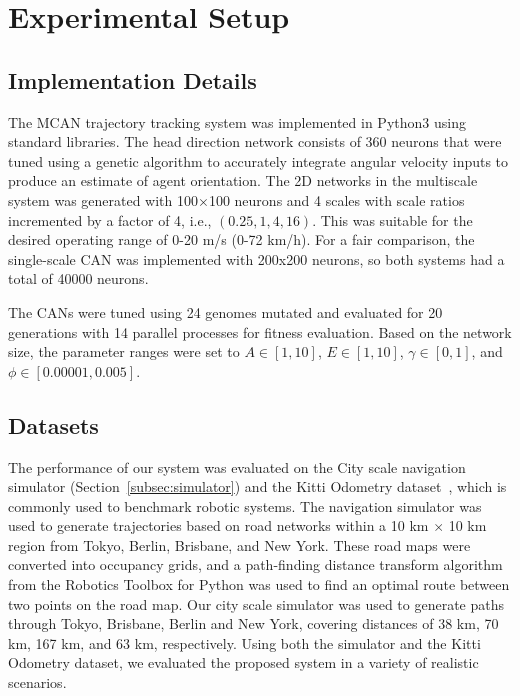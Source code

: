 \section{Experimental Setup}
\label{sec:experimentalsetup}
\subsection{Implementation Details}
The MCAN trajectory tracking system was implemented in Python3 using standard libraries. The head direction network consists of 360 neurons that were tuned using a genetic algorithm to accurately integrate angular velocity inputs to produce an estimate of agent orientation. The 2D networks in the multiscale system was generated with 100$\times$100 neurons and 4 scales with scale ratios incremented by a factor of 4, i.e., $(0.25, 1, 4, 16)$. This was suitable for the desired operating range of 0-20 m/s (0-72 km/h). For a fair comparison, the single-scale CAN was implemented with 200x200 neurons, so both systems had a total of 40000 neurons.  

The CANs were tuned using 24 genomes mutated and evaluated for 20 generations with 14 parallel processes for fitness evaluation. Based on the network size, the parameter ranges were set to $A \in [1, 10]$, $E \in [1, 10]$, $\gamma \in [0, 1]$, and $\phi \in [0.00001, 0.005]$.

\subsection{Datasets}
The performance of our system was evaluated on the City scale navigation simulator (Section~\ref{subsec:simulator}) and the Kitti Odometry dataset~\cite{geiger2012we}, which is commonly used to benchmark robotic systems. The navigation simulator was used to generate trajectories based on road networks within a 10 km $\times$ 10 km region from Tokyo, Berlin, Brisbane, and New York. These road maps were converted into occupancy grids, and a path-finding distance transform algorithm from the Robotics Toolbox for Python \cite{corke2021not} was used to find an optimal route between two points on the road map. Our city scale simulator was used to generate paths through Tokyo,  Brisbane, Berlin and New York, covering distances of 38 km, 70 km, 167 km, and 63 km, respectively. Using both the simulator and the Kitti Odometry dataset, we evaluated the proposed system in a variety of realistic scenarios.




